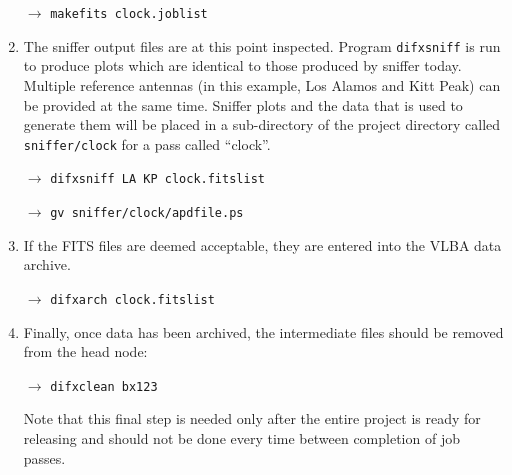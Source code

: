 \begin{enumerate}
$\longrightarrow$ {\tt makefits clock.joblist}

\item
The sniffer output files are at this point inspected.
Program {\tt difxsniff} is run to produce plots which are identical to those produced by sniffer today. 
Multiple reference antennas (in this example, Los Alamos and Kitt Peak) can be provided at the same time.
Sniffer plots and the data that is used to generate them will be placed in a sub-directory of the project directory called {\tt sniffer/clock} for a pass called ``clock''.

$\longrightarrow$ {\tt difxsniff LA KP clock.fitslist}

$\longrightarrow$ {\tt gv sniffer/clock/apdfile.ps}

\item
If the FITS files are deemed acceptable, they are entered into the VLBA data archive.

$\longrightarrow$ {\tt difxarch clock.fitslist}

\item
Finally, once data has been archived, the intermediate files should be removed from the head node:

$\longrightarrow$ {\tt difxclean bx123}

Note that this final step is needed only after the entire project is ready for releasing and should not be done every time between completion of job passes.

\end{enumerate}



